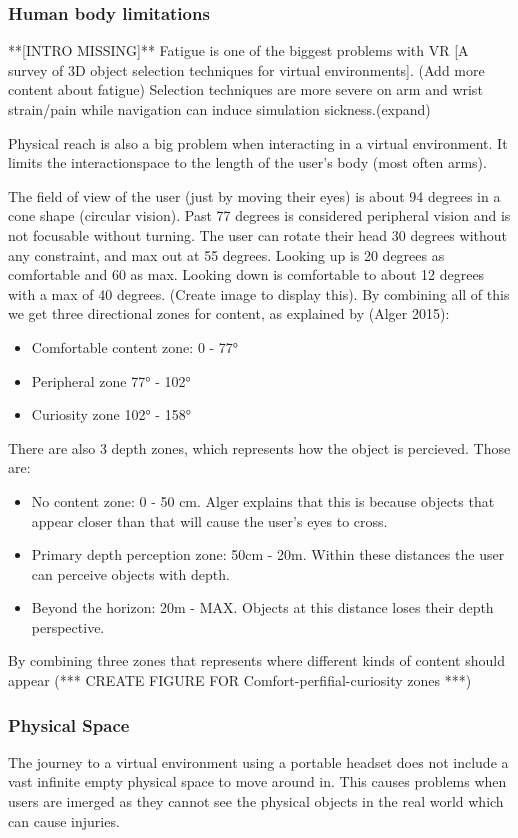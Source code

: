 \subsubsection{Human body limitations}
**[INTRO MISSING]**
Fatigue is one of the biggest problems with VR [A survey of 3D object selection techniques for virtual environments]. (Add more content about fatigue)
Selection techniques are more severe on arm and wrist strain/pain while navigation can induce simulation sickness.(expand)

Physical reach is also a big problem when interacting in a virtual environment. It limits the interactionspace to the length of the user's body (most often arms).

The field of view of the user (just by moving their eyes) is about 94 degrees in a cone shape (circular vision). Past 77 degrees is considered peripheral vision and is not focusable without turning. The user can rotate their head 30 degrees without any constraint, and max out at 55 degrees. Looking up is 20 degrees as comfortable and 60 as max. Looking down is comfortable to about 12 degrees with a max of 40 degrees. (Create image to display this). By combining all of this we get three directional zones for content, as explained by (Alger 2015):
\begin{itemize}
  \item Comfortable content zone: 0 - 77°
  \item Peripheral zone 77° - 102°
  \item Curiosity zone 102° - 158°
\end{itemize}
There are also 3 depth zones, which represents how the object is percieved. Those are:
\begin{itemize}
\item No content zone: 0 - 50 cm. Alger explains that this is because objects that appear closer than that will cause the user’s eyes to cross.
\item Primary depth perception zone: 50cm - 20m. Within these distances the user can perceive objects with depth.
\item Beyond the horizon: 20m - MAX. Objects at this distance loses their depth perspective.
\end{itemize}
By combining three zones that represents where different kinds of content should appear (*** CREATE FIGURE FOR Comfort-perfifial-curiosity zones ***)
\subsubsection{Physical Space}
The journey to a virtual environment using a portable headset does not include a vast infinite empty physical space to move around in. This causes problems when users are imerged as they cannot see the physical objects in the real world which can cause injuries.
